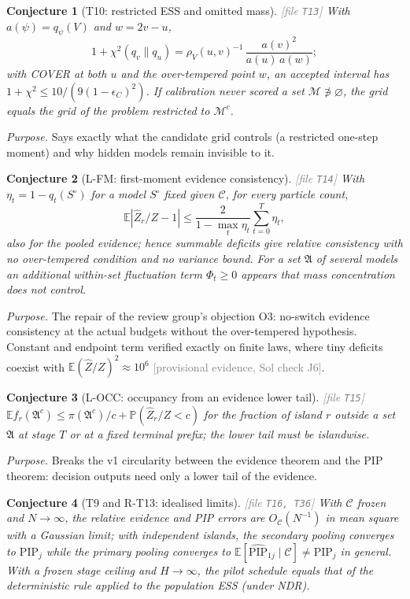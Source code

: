 \documentclass[11pt,a4paper]{article}
\theoremstyle{plain}
\newtheorem{conjecture}{Conjecture}[section]
\theoremstyle{definition}
\theoremstyle{remark}
\newcommand{\E}{\mathbb{E}}
\newcommand{\Prob}{\mathbb{P}}
\newcommand{\calC}{\mathcal{C}}
\newcommand{\calM}{\mathcal{M}}
\newcommand{\frakA}{\mathfrak{A}}
\newcommand{\PIP}{\mathrm{PIP}}
\newcommand{\PIPhat}{\widehat{\mathrm{PIP}}}
\newcommand{\Zhat}{\widehat Z}
\newcommand{\provisional}[1]{\textcolor{gray}{[provisional evidence, Sol check #1]}}
\newcommand{\thfile}[1]{\textcolor{gray}{\footnotesize[file \texttt{#1}]}}
\begin{document}
\begin{conjecture}[T10: restricted ESS and omitted mass]\thfile{T13}
With $a(\psi)=q_\psi(V)$ and $w=2v-u$,
\[
1+\chi^2(q_v\|q_u)=\rho_V(u,v)^{-1}\,\frac{a(v)^2}{a(u)\,a(w)};
\]
with COVER at both $u$ and the over-tempered point $w$, an accepted interval has $1+\chi^2\le10/(9(1-\epsilon_C)^2)$. If calibration never scored a set $\calM\not\ni\varnothing$, the grid equals the grid of the problem restricted to $\calM^c$.
\end{conjecture}
\emph{Purpose.} Says exactly what the candidate grid controls (a restricted one-step moment) and why hidden models remain invisible to it.

\begin{conjecture}[L-FM: first-moment evidence consistency]\thfile{T14}
With $\eta_t=1-q_t(S^\circ)$ for a model $S^\circ$ fixed given $\calC$, for every particle count,
\[
\E|\Zhat_r/Z-1|\le\frac{2}{1-\max_t\eta_t}\sum_{t=0}^{T}\eta_t,
\]
also for the pooled evidence; hence summable deficits give relative consistency with no over-tempered condition and no variance bound. For a set $\frakA$ of several models an additional within-set fluctuation term $\Phi_t\ge0$ appears that mass concentration does not control.
\end{conjecture}
\emph{Purpose.} The repair of the review group's objection O3: no-switch evidence consistency at the actual budgets without the over-tempered hypothesis. Constant and endpoint term verified exactly on finite laws, where tiny deficits coexist with $\E(\Zhat/Z)^2\approx10^6$ \provisional{J6}.

\begin{conjecture}[L-OCC: occupancy from an evidence lower tail]\thfile{T15}
$\E f_r(\frakA^c)\le\pi(\frakA^c)/c+\Prob(\Zhat_r/Z<c)$ for the fraction of island $r$ outside a set $\frakA$ at stage $T$ or at a fixed terminal prefix; the lower tail must be islandwise.
\end{conjecture}
\emph{Purpose.} Breaks the v1 circularity between the evidence theorem and the PIP theorem: decision outputs need only a lower tail of the evidence.

\begin{conjecture}[T9 and R-T13: idealised limits]\thfile{T16, T36}
With $\calC$ frozen and $N\to\infty$, the relative evidence and PIP errors are $O_{\calC}(N^{-1})$ in mean square with a Gaussian limit; with independent islands, the secondary pooling converges to $\PIP_j$ while the primary pooling converges to $\E[\PIPhat_{1j}\mid\calC]\neq\PIP_j$ in general. With a frozen stage ceiling and $H\to\infty$, the pilot schedule equals that of the deterministic rule applied to the population ESS (under NDR).
\end{conjecture}
\end{document}
